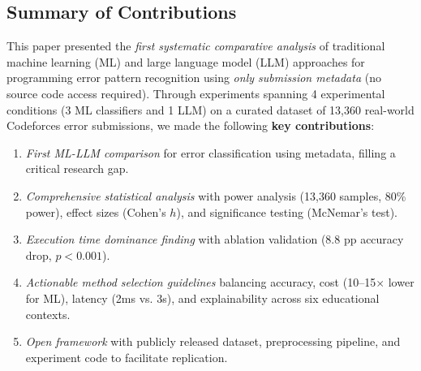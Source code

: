 \documentclass[10pt,a4paper]{article}
\begin{document}
\subsection*{Summary of Contributions}
This paper presented the \textit{first systematic comparative analysis} of traditional machine learning (ML) and large language model (LLM) approaches for programming error pattern recognition using \textit{only submission metadata} (no source code access required). Through experiments spanning 4 experimental conditions (3 ML classifiers and 1 LLM) on a curated dataset of 13,360 real-world Codeforces error submissions, we made the following \textbf{key contributions}:
{\renewcommand{\labelenumi}{(\arabic{enumi})}
\begin{enumerate}
\item \textit{First ML-LLM comparison} for error classification using metadata, filling a critical research gap.
\item \textit{Comprehensive statistical analysis} with power analysis (13,360 samples, 80\% power), effect sizes (Cohen's $h$), and significance testing (McNemar's test).
\item \textit{Execution time dominance finding} with ablation validation (8.8 pp accuracy drop, $p < 0.001$).
\item \textit{Actionable method selection guidelines} balancing accuracy, cost (10--15$\times$ lower for ML), latency (2ms vs. 3s), and explainability across six educational contexts.
\item \textit{Open framework} with publicly released dataset, preprocessing pipeline, and experiment code to facilitate replication.
\end{enumerate}}
\end{document}
